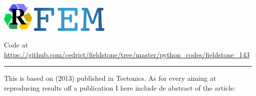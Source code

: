 
\includegraphics[width=1.5cm]{images/pictograms/replication}
\includegraphics[height=1.25cm]{images/pictograms/FEM}



\begin{center}
Code at \url{https://github.com/cedrict/fieldstone/tree/master/python_codes/fieldstone_143}
\end{center}

\par\noindent\rule{\textwidth}{0.4pt}


This \stone is based on \textcite{yahb13} (2013) published in Tectonics.
As for every \stone aiming at reproducing results off a publication I here include de abstract
of the article:

